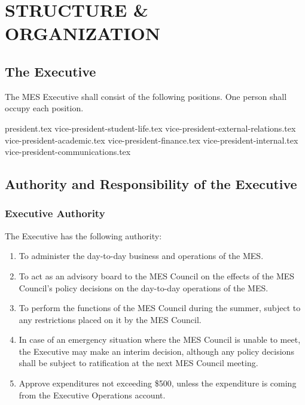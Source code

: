 \hypertarget{structure-organization}{%
 \section{STRUCTURE \& ORGANIZATION}
 \label{structure-organization}}

\hypertarget{the-executive}{%
 \subsection{The Executive}
 \label{the-executive}}

The MES Executive shall consist of the following positions. One person
shall occupy each position.

{president.tex}
{vice-president-student-life.tex}
{vice-president-external-relations.tex}
{vice-president-academic.tex}
{vice-president-finance.tex}
{vice-president-internal.tex}
{vice-president-communications.tex}

\hypertarget{authority-and-responsibility-of-the-executive}{%
 \subsection{Authority and Responsibility of the
  Executive}
 \label{authority-and-responsibility-of-the-executive}}
\hypertarget{executive-authority}{%
 \subsubsection{Executive Authority}
 \label{executive-authority}}

The Executive has the following authority:

\begin{enumerate}
 \item
  To administer the day-to-day business and operations of the MES.
 \item
  To act as an advisory board to the MES Council on the effects of the
  MES Council's policy decisions on the day-to-day operations of the
  MES.
 \item
  To perform the functions of the MES Council during the summer, subject
  to any restrictions placed on it by the MES Council.
 \item
  In case of an emergency situation where the MES Council is unable to
  meet, the Executive may make an interim decision, although any policy
  decisions shall be subject to ratification at the next MES Council
  meeting.
 \item
  Approve expenditures not exceeding \$500, unless the expenditure is
  coming from the Executive Operations account.

\end{enumerate}

